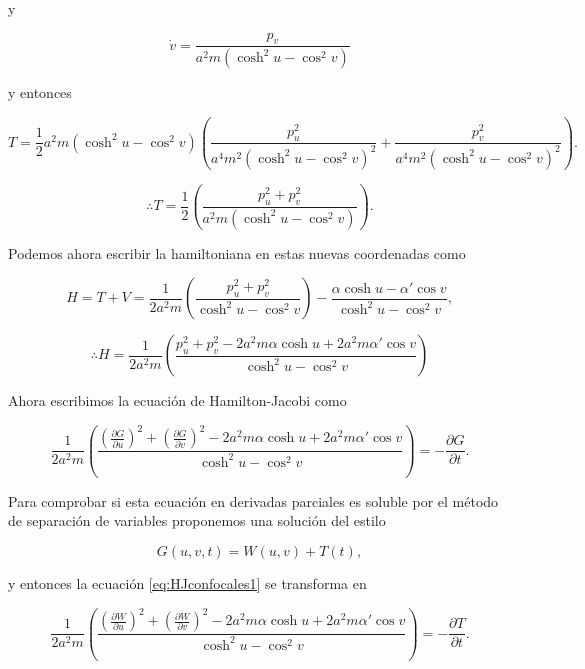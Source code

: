 \documentclass[a4paper,10pt]{article}
\numberwithin{equation}{section}
\begin{document}
y 

\begin{equation}
 \dot{v} = \frac{p_v}{a^2m(\cosh^2{u} - \cos^2{v})}
\end{equation}

y entonces 

\begin{equation}
 T = \frac{1}{2}a^2m(\cosh^2{u} - \cos^2{v})\left( \frac{p_u^2}{a^4m^2(\cosh^2{u} - \cos^2{v})^2} 
 + \frac{p_v^2}{a^4m^2(\cosh^2{u} - \cos^2{v})^2}\right).
\end{equation}

\begin{equation}
 \therefore T = \frac{1}{2}\left( \frac{p_u^2 + p_v^2}{a^2m(\cosh^2{u} - \cos^2{v})}\right).
\end{equation}


Podemos ahora escribir la hamiltoniana en estas nuevas coordenadas como 

\begin{equation}
 H = T + V = \frac{1}{2a^2m}\left( \frac{p_u^2 + p_v^2}{\cosh^2{u} - \cos^2{v}}\right) - \frac{\alpha \cosh{u} - \alpha'\cos{v}}{\cosh^2{u}- \cos^2{v}},
\end{equation}

\begin{equation}
 \therefore H = \frac{1}{2a^2m}\left( \frac{p_u^2 + p_v^2 - 2a^2m\alpha \cosh{u} + 2a^2m\alpha'\cos{v}}{\cosh^2{u}- \cos^2{v}}\right)
\end{equation}

Ahora escribimos la ecuación de Hamilton-Jacobi como

\begin{equation}
\frac{1}{2a^2m}\left( \frac{\left(\frac{\partial G}{\partial u} \right)^2 + 
\left(\frac{\partial G}{\partial v} \right)^2- 2a^2m\alpha \cosh{u} + 
2a^2m\alpha'\cos{v}}{\cosh^2{u}- \cos^2{v}}\right) = - \frac{\partial G}{\partial t}.
\label{eq:HJconfocales1}
\end{equation}

Para comprobar si esta ecuación en derivadas parciales es soluble por el método de 
separación de variables proponemos una solución del estilo 

\begin{equation}
 G(u,v,t) = W(u,v) + T(t),
\end{equation}

y entonces la ecuación \eqref{eq:HJconfocales1} se transforma en 

 \begin{equation}
\frac{1}{2a^2m}\left( \frac{\left(\frac{\partial W}{\partial u} \right)^2 + 
\left(\frac{\partial W}{\partial v} \right)^2- 2a^2m\alpha \cosh{u} + 
2a^2m\alpha'\cos{v}}{\cosh^2{u}- \cos^2{v}}\right) = - \frac{\partial T}{\partial t}.
\label{eq:HJconfocales2}
\end{equation}
\end{document}
